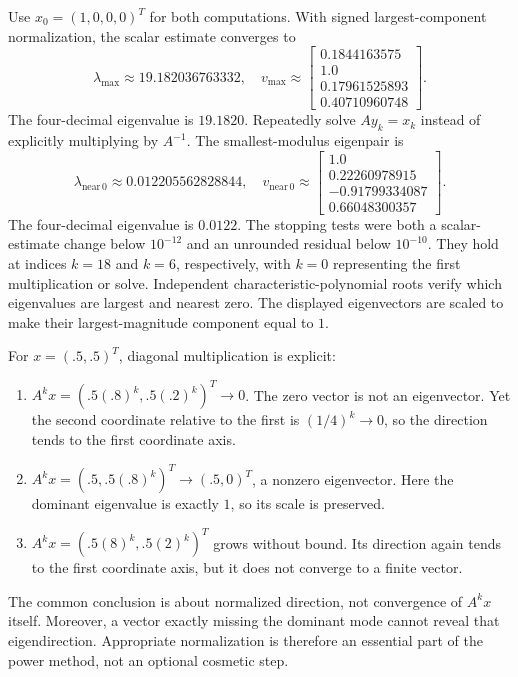 Use $x_0=(1,0,0,0)^T$ for both computations.
With signed largest-component normalization, the scalar estimate
converges to
\[\lambda_{\max}\approx19.182036763332,\quad
v_{\max}\approx\left[\begin{matrix}0.1844163575\\1.0\\0.17961525893\\0.40710960748\end{matrix}\right].\]
The four-decimal eigenvalue is $\boxed{19.1820}$.
Repeatedly solve $Ay_k=x_k$ instead of explicitly multiplying by
$A^{-1}$. The smallest-modulus eigenpair is
\[\lambda_{\mathrm{near}\,0}\approx0.012205562828844,\quad
v_{\mathrm{near}\,0}\approx\left[\begin{matrix}1.0\\0.22260978915\\-0.91799334087\\0.66048300357\end{matrix}\right].\]
The four-decimal eigenvalue is $\boxed{0.0122}$.
The stopping tests were both a scalar-estimate change below $10^{-12}$
and an unrounded residual below $10^{-10}$. They hold at indices
$k=18$ and $k=6$, respectively, with $k=0$
representing the first multiplication or solve.
Independent characteristic-polynomial roots verify which eigenvalues
are largest and nearest zero. The displayed eigenvectors are scaled
to make their largest-magnitude component equal to $1$.

For $x=(.5,.5)^T$, diagonal multiplication is explicit:
\begin{enumerate}[label=(\alph*)]
\item $A^kx=(.5(.8)^k,.5(.2)^k)^T\to0$.
The zero vector is not an eigenvector. Yet the second coordinate
relative to the first is $(1/4)^k\to0$, so the direction tends to
the first coordinate axis.
\item $A^kx=(.5,.5(.8)^k)^T\to(.5,0)^T$, a nonzero eigenvector.
Here the dominant eigenvalue is exactly $1$, so its scale is preserved.
\item $A^kx=(.5(8)^k,.5(2)^k)^T$ grows without bound.
Its direction again tends to the first coordinate axis, but it does
not converge to a finite vector.
\end{enumerate}
The common conclusion is about normalized direction, not convergence
of $A^kx$ itself. Moreover, a vector exactly missing the dominant mode
cannot reveal that eigendirection. Appropriate normalization is therefore
an essential part of the power method, not an optional cosmetic step.

